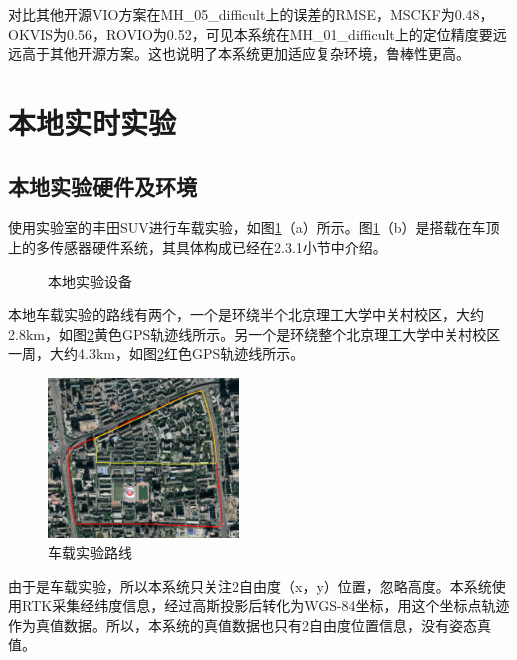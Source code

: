 对比其他开源VIO方案在MH\_05\_difficult上的误差的RMSE，MSCKF为0.48，OKVIS为0.56，ROVIO为0.52，可见本系统在MH\_01\_difficult上的定位精度要远远高于其他开源方案。这也说明了本系统更加适应复杂环境，鲁棒性更高。
\section{本地实时实验}
\subsection{本地实验硬件及环境}
使用实验室的丰田SUV进行车载实验，如图\ref{fig5_13}（a）所示。图\ref{fig5_13}（b）是搭载在车顶上的多传感器硬件系统，其具体构成已经在2.3.1小节中介绍。
\begin{figure}[h]\setlength{\belowcaptionskip}{-12pt}
	\centering
	\hspace{0.5cm}
	\caption{本地实验设备} \label{fig5_13}
\end{figure}

本地车载实验的路线有两个，一个是环绕半个北京理工大学中关村校区，大约2.8km，如图\ref{fig5_14}黄色GPS轨迹线所示。另一个是环绕整个北京理工大学中关村校区一周，大约4.3km，如图\ref{fig5_14}红色GPS轨迹线所示。
\begin{figure}[h]\setlength{\belowcaptionskip}{-12pt}
	\centering
	\includegraphics[width=0.45\textwidth]{figures/chapter5/fig5_14}
	\caption{车载实验路线}\label{fig5_14}
\end{figure}
由于是车载实验，所以本系统只关注2自由度（x，y）位置，忽略高度。本系统使用RTK采集经纬度信息，经过高斯投影后转化为WGS-84坐标，用这个坐标点轨迹作为真值数据。所以，本系统的真值数据也只有2自由度位置信息，没有姿态真值。
